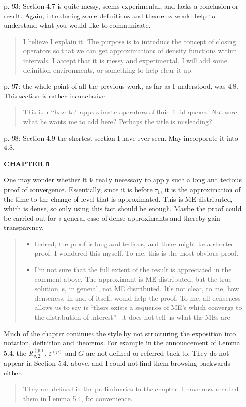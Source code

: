 \documentclass[a4paper]{article}
\begin{document}
p. 93: Section 4.7 is quite messy, seems experimental, and lacks a conclusion or result. Again, introducing some definitions and theorems would help to understand what you would like to communicate.
\begin{quote}
    I believe I explain it. The purpose is to introduce the concept of closing operators so that we can get approximations of density functions within intervals. I accept that it is messy and experimental. I will add some definition environments, or something to help clear it up. 
\end{quote}

p. 97: the whole point of all the previous work, as far as I understood, was 4.8. This section is rather inconclusive.
\begin{quote}
    This is a ``how to'' approximate operators of fluid-fluid queues. Not sure what he wants me to add here? Perhaps the title is misleading?
\end{quote}

\st{p. 98: Section 4.9 the shortest section I have ever seen. May incorporate it into 4.8.} 

\noindent\textbf{CHAPTER 5}

One may wonder whether it is really necessary to apply such a long and tedious proof of convergence. Essentially, since it is before \(\tau_1\), it is the approximation of the time to the change of level that is approximated. This is ME distributed, which is dense, so only using this fact should be enough. Maybe the proof could be carried out for a general case of dense approximants and thereby gain transparency.
\begin{quote}
    \begin{itemize}
        \item Indeed, the proof is long and tedious, and there might be a shorter proof. I wondered this myself. To me, this is the most obvious proof. 
        \item I'm not sure that the full extent of the result is appreciated in the comment above. The approximant is ME distributed, but the true solution is, in general, not ME distributed. It's not clear, to me, how denseness, in and of itself, would help the proof. To me, all denseness allows us to say is ``there exists a sequence of ME's which converge to the distribution of interest'' --it does not tell us what the MEs are. 
    \end{itemize}
\end{quote}

Much of the chapter continues the style by not structuring the exposition into notation, definition and theorems. For example in the announcement of Lemma 5.4, the \(R_{v,2}^{(p)}\), \(\varepsilon^{(p)}\) and \(G\) are not defined or referred back to. They do not appear in Section 5.4. above, and I could not find them browsing backwards either.
\begin{quote}
    They are defined in the preliminaries to the chapter. I have now recalled them in Lemma 5.4, for convenience. 
\end{quote}
\end{document}
